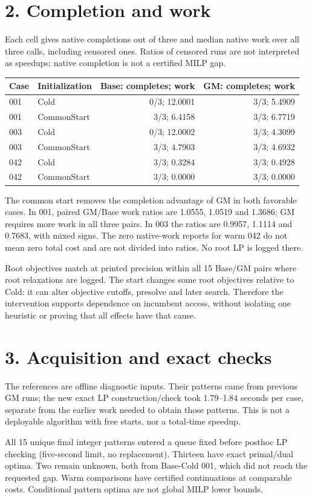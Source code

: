 \documentclass[10pt,a4paper]{article}
\begin{document}
\section*{2. Completion and work}
Each cell gives native completions out of three and median native work over
all three calls, including censored ones. Ratios of censored runs are not
interpreted as speedups; native completion is not a certified MILP gap.
\begin{center}\small
\begin{tabular}{llrr}\toprule
Case&Initialization&Base: completes; work&GM: completes; work\\\midrule
001&Cold&0/3; 12.0001&3/3; 5.4909\\
001&CommonStart&3/3; 6.4158&3/3; 6.7719\\
003&Cold&0/3; 12.0002&3/3; 4.3099\\
003&CommonStart&3/3; 4.7903&3/3; 4.6932\\
042&Cold&3/3; 0.3284&3/3; 0.4928\\
042&CommonStart&3/3; 0.0000&3/3; 0.0000\\
\bottomrule\end{tabular}\end{center}
The common start removes the completion advantage of GM in both favorable
cases. In 001, paired GM/Base work ratios are 1.0555, 1.0519 and 1.3686; GM
requires more work in all three pairs. In 003 the ratios are 0.9957, 1.1114 and
0.7683, with mixed signs. The zero native-work reports for warm 042 do not mean
zero total cost and are not divided into ratios. No root LP is logged there.

Root objectives match at printed precision within all 15 Base/GM pairs where
root relaxations are logged. The start changes some root objectives relative
to Cold: it can alter objective cutoffs, presolve and later search. Therefore
the intervention supports dependence on incumbent access, without isolating
one heuristic or proving that all effects have that cause.
\newpage
\section*{3. Acquisition and exact checks}
The references are offline diagnostic inputs. Their patterns came from
previous GM runs; the new exact LP construction/check took 1.79--1.84 seconds
per case, separate from the earlier work needed to obtain those patterns.
This is not a deployable algorithm with free starts, nor a total-time speedup.

All 15 unique final integer patterns entered a queue fixed before posthoc LP
checking (five-second limit, no replacement). Thirteen have exact primal/dual
optima. Two remain unknown, both from Base-Cold 001, which did not reach the
requested gap. Warm comparisons have certified continuations at comparable
costs. Conditional pattern optima are not global MILP lower bounds.
\end{document}
